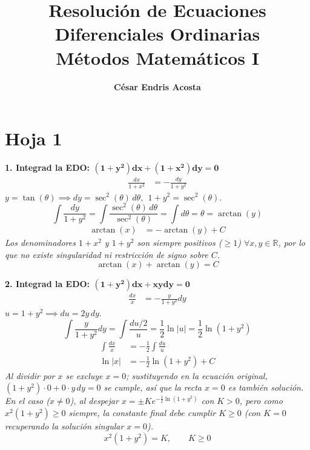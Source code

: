 \documentclass[11pt, a4paper]{article}
\title{\vspace{-1.5cm}\textbf{Resolución de Ecuaciones Diferenciales Ordinarias}\\ \large Métodos Matemáticos I}
\author{\textbf{César Endris Acosta}}
\begin{document}
\maketitle
\vspace{0.2cm}

\section{Hoja 1}

\noindent\textbf{1. Integrad la EDO: $\bm{(1+y^2)dx + (1+x^2)dy = 0}$} \\
\begin{align*}
\frac{dx}{1+x^2} &= -\frac{dy}{1+y^2}
\end{align*}
$y = \tan(\theta) \implies dy = \sec^2(\theta)\,d\theta,\ \ 1+y^2=\sec^2(\theta)$.
\[
\int \frac{dy}{1+y^2} = \int \frac{\sec^2(\theta)\,d\theta}{\sec^2(\theta)} = \int d\theta = \theta = \arctan(y)
\]
\begin{align*}
\arctan(x) &= -\arctan(y) + C
\end{align*}
\textit{Los denominadores $1+x^2$ y $1+y^2$ son siempre positivos ($\geq 1$) $\forall x,y\in\mathbb{R}$, por lo que no existe singularidad ni restricción de signo sobre $C$.}
\[
\boxed{\arctan(x) + \arctan(y) = C}
\]


\noindent\textbf{2. Integrad la EDO: $\bm{(1+y^2)dx + xydy = 0}$} \\
\begin{align*}
\frac{dx}{x} &= -\frac{y}{1+y^2}dy
\end{align*}
$u = 1+y^2 \implies du = 2y\,dy $.
\[
\int \frac{y}{1+y^2}dy = \int \frac{du/2}{u} = \frac{1}{2}\ln|u| = \frac{1}{2}\ln(1+y^2)
\]
\begin{align*}
\int \frac{dx}{x} &= -\frac{1}{2}\int \frac{du}{u} \\
\ln|x| &= -\frac{1}{2}\ln(1+y^2) + C
\end{align*}
\textit{Al dividir por $x$ se excluye $x=0$; sustituyendo en la ecuación original, $(1+y^2)\cdot 0 + 0\cdot y\,dy=0$ se cumple, así que la recta $x=0$ es también solución. En el caso ($x\neq0$), al despejar $x= \pm Ke^{-\frac12\ln(1+y^2)}$ con $K>0$, pero como $x^2(1+y^2)\geq0$ siempre, la constante final debe cumplir $K\geq0$ (con $K=0$ recuperando la solución singular $x=0$).}
\[
\boxed{x^2(1+y^2) = K, \qquad K\geq 0}
\]
\end{document}
